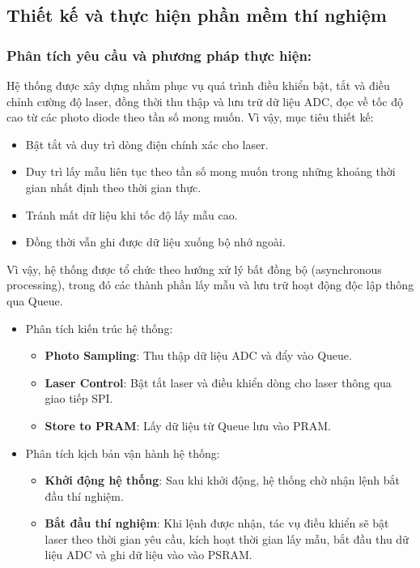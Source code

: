 \subsection{Thiết kế và thực hiện phần mềm thí nghiệm}
\label{sec:yeu_cau_thiet_ke_phan_mem_thi_nghiem}

\subsubsection{Phân tích yêu cầu và phương pháp thực hiện:}

Hệ thống được xây dựng nhằm phục vụ quá trình điều khiển bật, tắt và điều chỉnh cường độ laser, đồng thời thu thập và lưu trữ dữ liệu ADC, đọc về tốc độ cao từ các photo diode theo tần số mong muốn. Vì vậy, mục tiêu thiết kế:

    \begin{itemize}
        \item Bật tắt và duy trì dòng điện chính xác cho laser.
        \item Duy trì lấy mẫu liên tục theo tần số mong muốn trong những khoảng thời gian nhất định theo thời gian thực.
        \item Tránh mất dữ liệu khi tốc độ lấy mẫu cao.
        \item Đồng thời vẫn ghi được dữ liệu xuống bộ nhớ ngoài.
    \end{itemize}
    Vì vậy, hệ thống được tổ chức theo hướng xử lý bất đồng bộ (asynchronous processing), trong đó các thành phần lấy mẫu và lưu trữ hoạt động độc lập thông qua Queue.
    
    \begin{itemize}

    \item Phân tích kiến trúc hệ thống:
    \begin{itemize}
        \item \textbf{Photo Sampling}: Thu thập dữ liệu ADC và đẩy vào Queue.
        \item \textbf{Laser Control}: Bật tắt laser và điều khiển dòng cho laser thông qua giao tiếp SPI.
        \item \textbf{Store to PRAM}: Lấy dữ liệu từ Queue lưu vào PRAM.
    \end{itemize}

    \item Phân tích kịch bản vận hành hệ thống:
    \begin{itemize}
        \item \textbf{Khởi động hệ thống}: Sau khi khởi động, hệ thống chờ nhận lệnh bắt đầu thí nghiệm.
        \item \textbf{Bắt đầu thí nghiệm}: Khi lệnh được nhận, tác vụ điều khiển sẽ bật laser theo thời gian yêu cầu, kích hoạt thời gian lấy mẫu, bắt đầu thu dữ liệu ADC và ghi dữ liệu vào  vào PSRAM.
    \end{itemize}

\end{itemize}



